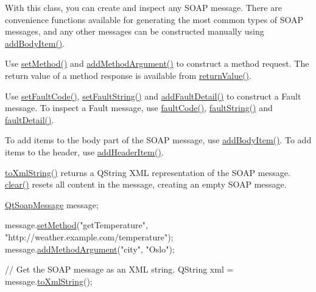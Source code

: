 With this class, you can create and inspect any S\+O\+AP message. There are convenience functions available for generating the most common types of S\+O\+AP messages, and any other messages can be constructed manually using \mbox{\hyperlink{class_qt_soap_message_a16c43285b934153623d541f061dd1910}{add\+Body\+Item()}}.

Use \mbox{\hyperlink{class_qt_soap_message_a792f4e366d4bf4c3ca09ea6f034237b5}{set\+Method()}} and \mbox{\hyperlink{class_qt_soap_message_a07c31536525e366258d54c75d955de50}{add\+Method\+Argument()}} to construct a method request. The return value of a method response is available from \mbox{\hyperlink{class_qt_soap_message_ac223f69e31d5f9ff251a467149c547d5}{return\+Value()}}.

Use \mbox{\hyperlink{class_qt_soap_message_af8fd208d7b0a07f9b79581562da32b01}{set\+Fault\+Code()}}, \mbox{\hyperlink{class_qt_soap_message_ae671efb37455beb8b5ee1247098622b5}{set\+Fault\+String()}} and \mbox{\hyperlink{class_qt_soap_message_af0cd7c0da675f83e91dcc5c29faf7382}{add\+Fault\+Detail()}} to construct a Fault message. To inspect a Fault message, use \mbox{\hyperlink{class_qt_soap_message_a2f5bbde1c34bddebd81ba112087c78c3}{fault\+Code()}}, \mbox{\hyperlink{class_qt_soap_message_a11b95f781994094c764e457f800a3a21}{fault\+String()}} and \mbox{\hyperlink{class_qt_soap_message_a6263ac6f8823f9e2a00e83ba2bf5c4dd}{fault\+Detail()}}.

To add items to the body part of the S\+O\+AP message, use \mbox{\hyperlink{class_qt_soap_message_a16c43285b934153623d541f061dd1910}{add\+Body\+Item()}}. To add items to the header, use \mbox{\hyperlink{class_qt_soap_message_a61b9c16754a167088a107eb34473683e}{add\+Header\+Item()}}.

\mbox{\hyperlink{class_qt_soap_message_a5c9c6997f2ee1b35bf73a7988ef87213}{to\+Xml\+String()}} returns a Q\+String X\+ML representation of the S\+O\+AP message. \mbox{\hyperlink{class_qt_soap_message_aba7b362184f4d75405a237014d46cad6}{clear()}} resets all content in the message, creating an empty S\+O\+AP message.


\begin{DoxyCode}
\mbox{\hyperlink{class_qt_soap_message}{QtSoapMessage}} message;

message.\mbox{\hyperlink{class_qt_soap_message_a792f4e366d4bf4c3ca09ea6f034237b5}{setMethod}}(\textcolor{stringliteral}{"getTemperature"}, \textcolor{stringliteral}{"http://weather.example.com/temperature"});
message.\mbox{\hyperlink{class_qt_soap_message_a07c31536525e366258d54c75d955de50}{addMethodArgument}}(\textcolor{stringliteral}{"city"}, \textcolor{stringliteral}{"Oslo"});

\textcolor{comment}{// Get the SOAP message as an XML string.}
QString xml = message.\mbox{\hyperlink{class_qt_soap_message_a5c9c6997f2ee1b35bf73a7988ef87213}{toXmlString}}();
\end{DoxyCode}


